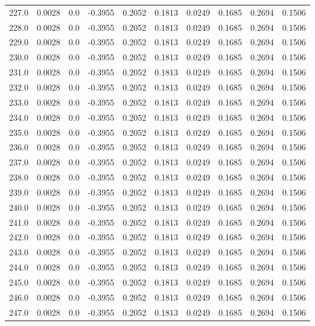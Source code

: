 \begin{longtable}{lrrrrrrrrr}
227.0 & 0.0028 & 0.0 & -0.3955 & 0.2052 & 0.1813 & 0.0249 & 0.1685 & 0.2694 & 0.1506 \\
228.0 & 0.0028 & 0.0 & -0.3955 & 0.2052 & 0.1813 & 0.0249 & 0.1685 & 0.2694 & 0.1506 \\
229.0 & 0.0028 & 0.0 & -0.3955 & 0.2052 & 0.1813 & 0.0249 & 0.1685 & 0.2694 & 0.1506 \\
230.0 & 0.0028 & 0.0 & -0.3955 & 0.2052 & 0.1813 & 0.0249 & 0.1685 & 0.2694 & 0.1506 \\
231.0 & 0.0028 & 0.0 & -0.3955 & 0.2052 & 0.1813 & 0.0249 & 0.1685 & 0.2694 & 0.1506 \\
232.0 & 0.0028 & 0.0 & -0.3955 & 0.2052 & 0.1813 & 0.0249 & 0.1685 & 0.2694 & 0.1506 \\
233.0 & 0.0028 & 0.0 & -0.3955 & 0.2052 & 0.1813 & 0.0249 & 0.1685 & 0.2694 & 0.1506 \\
234.0 & 0.0028 & 0.0 & -0.3955 & 0.2052 & 0.1813 & 0.0249 & 0.1685 & 0.2694 & 0.1506 \\
235.0 & 0.0028 & 0.0 & -0.3955 & 0.2052 & 0.1813 & 0.0249 & 0.1685 & 0.2694 & 0.1506 \\
236.0 & 0.0028 & 0.0 & -0.3955 & 0.2052 & 0.1813 & 0.0249 & 0.1685 & 0.2694 & 0.1506 \\
237.0 & 0.0028 & 0.0 & -0.3955 & 0.2052 & 0.1813 & 0.0249 & 0.1685 & 0.2694 & 0.1506 \\
238.0 & 0.0028 & 0.0 & -0.3955 & 0.2052 & 0.1813 & 0.0249 & 0.1685 & 0.2694 & 0.1506 \\
239.0 & 0.0028 & 0.0 & -0.3955 & 0.2052 & 0.1813 & 0.0249 & 0.1685 & 0.2694 & 0.1506 \\
240.0 & 0.0028 & 0.0 & -0.3955 & 0.2052 & 0.1813 & 0.0249 & 0.1685 & 0.2694 & 0.1506 \\
241.0 & 0.0028 & 0.0 & -0.3955 & 0.2052 & 0.1813 & 0.0249 & 0.1685 & 0.2694 & 0.1506 \\
242.0 & 0.0028 & 0.0 & -0.3955 & 0.2052 & 0.1813 & 0.0249 & 0.1685 & 0.2694 & 0.1506 \\
243.0 & 0.0028 & 0.0 & -0.3955 & 0.2052 & 0.1813 & 0.0249 & 0.1685 & 0.2694 & 0.1506 \\
244.0 & 0.0028 & 0.0 & -0.3955 & 0.2052 & 0.1813 & 0.0249 & 0.1685 & 0.2694 & 0.1506 \\
245.0 & 0.0028 & 0.0 & -0.3955 & 0.2052 & 0.1813 & 0.0249 & 0.1685 & 0.2694 & 0.1506 \\
246.0 & 0.0028 & 0.0 & -0.3955 & 0.2052 & 0.1813 & 0.0249 & 0.1685 & 0.2694 & 0.1506 \\
247.0 & 0.0028 & 0.0 & -0.3955 & 0.2052 & 0.1813 & 0.0249 & 0.1685 & 0.2694 & 0.1506 \\

\end{longtable}
